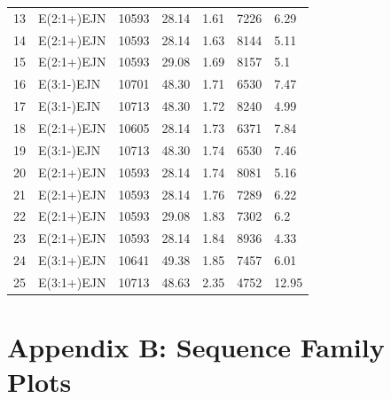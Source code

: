 \documentclass[letterpaper, paper,11pt]{AAS}	%
\begin{document}
\begin{table}[h!]
\begin{tabular}{lllllll}
    13                 & E(2:1+)EJN        & 10593                 & 28.14       & 1.61        & 7226      & 6.29          \\
    14                 & E(2:1+)EJN        & 10593                 & 28.14       & 1.63        & 8144      & 5.11          \\
    15                 & E(2:1+)EJN        & 10593                 & 29.08       & 1.69        & 8157      & 5.1           \\
    16                 & E(3:1-)EJN        & 10701                 & 48.30       & 1.71        & 6530      & 7.47          \\
    17                 & E(3:1-)EJN        & 10713                 & 48.30       & 1.72        & 8240      & 4.99          \\
    18                 & E(2:1+)EJN        & 10605                 & 28.14       & 1.73        & 6371      & 7.84          \\
    19                 & E(3:1-)EJN        & 10713                 & 48.30       & 1.74        & 6530      & 7.46          \\
    20                 & E(2:1+)EJN        & 10593                 & 28.14       & 1.74        & 8081      & 5.16          \\
    21                 & E(2:1+)EJN        & 10593                 & 28.14       & 1.76        & 7289      & 6.22          \\
    22                 & E(2:1+)EJN        & 10593                 & 29.08       & 1.83        & 7302      & 6.2           \\
    23                 & E(2:1+)EJN        & 10593                 & 28.14       & 1.84        & 8936      & 4.33          \\
    24                 & E(3:1+)EJN        & 10641                 & 49.38       & 1.85        & 7457      & 6.01          \\
    \rowcolor{lightgray}25                 & E(3:1+)EJN        & 10713                 & 48.63       & 2.35        & 4752      & 12.95         \\
    \bottomrule
    \end{tabular}
\end{table}
\fi

\clearpage

\section*{Appendix B: Sequence Family Plots}
\end{document}
